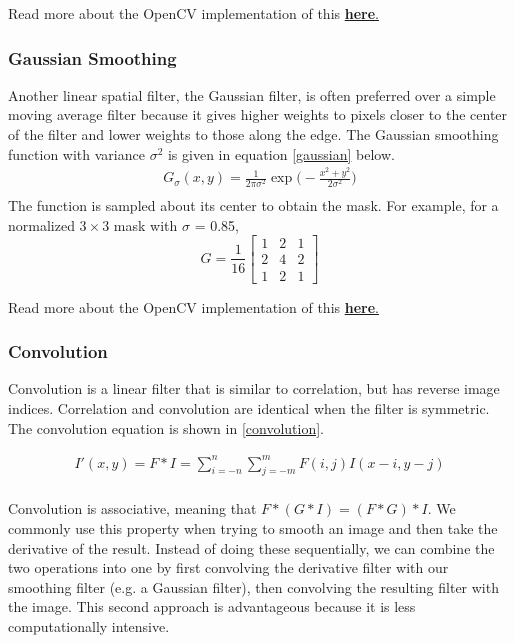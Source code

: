 \documentclass[twoside]{article}
\begin{document}
Read more about the OpenCV implementation of this  \href{https://docs.opencv.org/3.1.0/d4/d86/group__imgproc__filter.html#ga8c45db9afe636703801b0b2e440fce37}{\textbf{here}.} 

\subsubsection{Gaussian Smoothing}
Another linear spatial filter, the Gaussian filter, is often preferred over a simple moving average filter because it gives higher weights to pixels closer to the center of the filter and lower weights to those along the edge. The Gaussian smoothing function with variance $\sigma^2$ is given in equation \ref{gaussian} below.
\begin{equation}
  \label{gaussian}
  \begin{aligned}
    G_\sigma(x,y) = \frac{1}{2\pi\sigma^2} \exp \bigg(-\frac{x^2 + y^2}{2\sigma^2} \bigg)\\
  \end{aligned}
\end{equation}
The function is sampled about its center to obtain the mask. For example, for a normalized $3\times3$ mask with $\sigma$ = 0.85,
\[
G = \frac{1}{16}
\begin{bmatrix}
1 & 2 & 1\\
2 & 4 & 2\\
1 & 2 & 1
\end{bmatrix}
\]

Read more about the OpenCV implementation of this  \href{https://docs.opencv.org/3.1.0/d4/d86/group__imgproc__filter.html#gaabe8c836e97159a9193fb0b11ac52cf1}{\textbf{here}.} 

\subsubsection{Convolution}
Convolution is a linear filter that is similar to correlation, but has reverse image indices. Correlation and convolution are identical when the filter is symmetric. The convolution equation is shown in \ref{convolution}.

\begin{equation}
  \label{convolution}
  \begin{aligned}
    I'(x,y) = F * I = \sum_{i=-n}^n \sum_{j=-m}^m F(i,j)I(x-i,y-j)\\
  \end{aligned}
\end{equation}

Convolution is associative, meaning that $F*(G*I) = (F*G)*I$. We commonly use this property when trying to smooth an image and then take the derivative of the result. Instead of doing these sequentially, we can combine the two operations into one by first convolving the derivative filter with our smoothing filter (e.g. a Gaussian filter), then convolving the resulting filter with the image. This second approach is advantageous because it is less computationally intensive.
\end{document}

